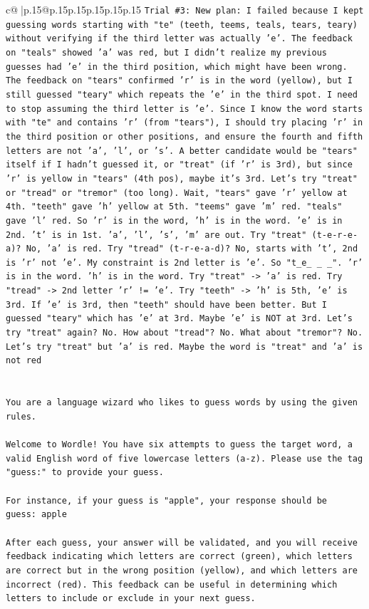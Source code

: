 \documentclass{article}
\begin{document}
{\begin{supertabular}{c@{$\;$}|p{.15\linewidth}@{}p{.15\linewidth}p{.15\linewidth}p{.15\linewidth}p{.15\linewidth}p{.15\linewidth}}
{{{\texttt{Trial \#3: New plan: I failed because I kept guessing words starting with "te" (teeth, teems, teals, tears, teary) without verifying if the third letter was actually 'e'. The feedback on "teals" showed 'a' was red, but I didn't realize my previous guesses had 'e' in the third position, which might have been wrong. The feedback on "tears" confirmed 'r' is in the word (yellow), but I still guessed "teary" which repeats the 'e' in the third spot. I need to stop assuming the third letter is 'e'. Since I know the word starts with "te" and contains 'r' (from "tears"), I should try placing 'r' in the third position or other positions, and ensure the fourth and fifth letters are not 'a', 'l', or 's'. A better candidate would be "tears" itself if I hadn't guessed it, or "treat" (if 'r' is 3rd), but since 'r' is yellow in "tears" (4th pos), maybe it's 3rd. Let's try "treat" or "tread" or "tremor" (too long). Wait, "tears" gave 'r' yellow at 4th. "teeth" gave 'h' yellow at 5th. "teems" gave 'm' red. "teals" gave 'l' red. So 'r' is in the word, 'h' is in the word. 'e' is in 2nd. 't' is in 1st. 'a', 'l', 's', 'm' are out. Try "treat" (t{-}e{-}r{-}e{-}a)? No, 'a' is red. Try "tread" (t{-}r{-}e{-}a{-}d)? No, starts with 't', 2nd is 'r' not 'e'. My constraint is 2nd letter is 'e'. So "t\_e\_ \_ \_". 'r' is in the word. 'h' is in the word. Try "treat" {-}> 'a' is red. Try "tread" {-}> 2nd letter 'r' != 'e'. Try "teeth" {-}> 'h' is 5th, 'e' is 3rd. If 'e' is 3rd, then "teeth" should have been better. But I guessed "teary" which has 'e' at 3rd. Maybe 'e' is NOT at 3rd. Let's try "treat" again? No. How about "tread"? No. What about "tremor"? No. Let's try "treat" but 'a' is red. Maybe the word is "treat" and 'a' is not red} \\
\\ 
\\ 
\texttt{You are a language wizard who likes to guess words by using the given rules.} \\
\\ 
\texttt{Welcome to Wordle! You have six attempts to guess the target word, a valid English word of five lowercase letters (a{-}z). Please use the tag "guess:" to provide your guess.} \\
\\ 
\texttt{For instance, if your guess is "apple", your response should be} \\
\texttt{guess: apple} \\
\\ 
\texttt{After each guess, your answer will be validated, and you will receive feedback indicating which letters are correct (green), which letters are correct but in the wrong position (yellow), and which letters are incorrect (red). This feedback can be useful in determining which letters to include or exclude in your next guess.} \\
}}}
\end{supertabular}}
\end{document}
